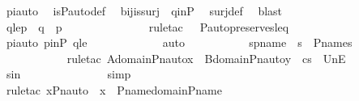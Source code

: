 \begin{isabellebody}
\ piauto\ \isamarkupfalse%
\ is{\isacharunderscore}{\kern0pt}P{\isacharunderscore}{\kern0pt}auto{\isacharunderscore}{\kern0pt}def\ \isamarkupfalse%
\ bij{\isacharunderscore}{\kern0pt}is{\isacharunderscore}{\kern0pt}surj\ \ q{\isacharprime}{\kern0pt}inP\ \isamarkupfalse%
\ surj{\isacharunderscore}{\kern0pt}def\ \isamarkupfalse%
\ blast\ \isanewline
\ \ \ \ \ \ \ \ \isamarkupfalse%
\ \isamarkupfalse%
\ qlep\ {\isacharcolon}{\kern0pt}\ {\isachardoublequoteopen}q\ {\isasympreceq}\ p{\isachardoublequoteclose}\ \ \ \isanewline
\ \ \ \ \ \ \ \ \ \ \isamarkupfalse%
\ {\isacharparenleft}{\kern0pt}rule{\isacharunderscore}{\kern0pt}tac\ {\isasympi}{\isacharequal}{\kern0pt}{\isasympi}\ \ P{\isacharunderscore}{\kern0pt}auto{\isacharunderscore}{\kern0pt}preserves{\isacharunderscore}{\kern0pt}leq{\isacharprime}{\kern0pt}{\isacharparenright}{\kern0pt}\ \isanewline
\ \ \ \ \ \ \ \ \ \ \isamarkupfalse%
\ piauto\ pinP\ q{\isacharprime}{\kern0pt}le\ \isanewline
\ \ \ \ \ \ \ \ \ \ \isamarkupfalse%
\ auto\ \isanewline
\isanewline
\ \ \ \ \ \ \ \ \isamarkupfalse%
\ s{\isacharprime}{\kern0pt}pname\ {\isacharcolon}{\kern0pt}\ {\isachardoublequoteopen}s{\isacharprime}{\kern0pt}\ {\isasymin}\ P{\isacharunderscore}{\kern0pt}names{\isachardoublequoteclose}\ \isanewline
\ \ \ \ \ \ \ \ \ \ \isamarkupfalse%
\ {\isacharparenleft}{\kern0pt}rule{\isacharunderscore}{\kern0pt}tac\ A{\isacharequal}{\kern0pt}{\isachardoublequoteopen}domain{\isacharparenleft}{\kern0pt}Pn{\isacharunderscore}{\kern0pt}auto{\isacharparenleft}{\kern0pt}{\isasympi}{\isacharparenright}{\kern0pt}{\isacharbackquote}{\kern0pt}x{\isacharparenright}{\kern0pt}{\isachardoublequoteclose}\ \ B{\isacharequal}{\kern0pt}{\isachardoublequoteopen}domain{\isacharparenleft}{\kern0pt}Pn{\isacharunderscore}{\kern0pt}auto{\isacharparenleft}{\kern0pt}{\isasympi}{\isacharparenright}{\kern0pt}{\isacharbackquote}{\kern0pt}y{\isacharparenright}{\kern0pt}{\isachardoublequoteclose}\ \ c{\isacharequal}{\kern0pt}s{\isacharprime}{\kern0pt}\ \ UnE{\isacharparenright}{\kern0pt}\isanewline
\ \ \ \ \ \ \ \ \ \ \isamarkupfalse%
\ s{\isacharprime}{\kern0pt}in\ \isanewline
\ \ \ \ \ \ \ \ \ \ \ \ \isamarkupfalse%
\ simp\ \isanewline
\ \ \ \ \ \ \ \ \ \ \ \isamarkupfalse%
\ {\isacharparenleft}{\kern0pt}rule{\isacharunderscore}{\kern0pt}tac\ x{\isacharequal}{\kern0pt}{\isachardoublequoteopen}{\isacharparenleft}{\kern0pt}Pn{\isacharunderscore}{\kern0pt}auto{\isacharparenleft}{\kern0pt}{\isasympi}{\isacharparenright}{\kern0pt}\ {\isacharbackquote}{\kern0pt}\ x{\isacharparenright}{\kern0pt}{\isachardoublequoteclose}\ \ P{\isacharunderscore}{\kern0pt}name{\isacharunderscore}{\kern0pt}domain{\isacharunderscore}{\kern0pt}P{\isacharunderscore}{\kern0pt}name{\isacharprime}{\kern0pt}{\isacharparenright}{\kern0pt}\ \isanewline

\end{isabellebody}
